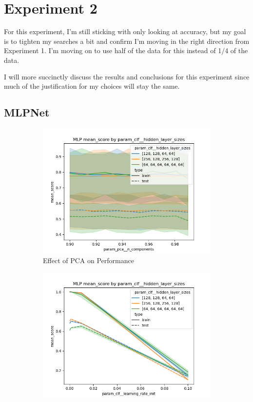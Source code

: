\documentclass[12pt]{article}
\begin{document}
\section{Experiment 2}
For this experiment, I'm still sticking with only looking at accuracy, but my goal is to tighten my searches a bit and 
confirm I'm moving in the right direction from Experiment 1. I'm moving on to use half of the data for this instead of 1/4
of the data.

I will more succinctly discuss the results and conclusions for this experiment since much of the justification for my choices 
will stay the same.

\subsection{MLPNet}
\begin{figure}
    \begin{subfigure}{.5\textwidth}
        \includegraphics[width=.95\textwidth]{../../results_Experiment2/mlp/param_clf__hidden_layer_sizes_mean_score_param_pca__n_components.png}
        \caption{Effect of PCA on Performance}
        \end{subfigure}%
      \begin{subfigure}{.5\textwidth}
        \includegraphics[width=.95\textwidth]{../../results_Experiment2/mlp/param_clf__hidden_layer_sizes_mean_score_param_clf__learning_rate_init.png}

\end{subfigure}
\end{figure}
\end{document}
